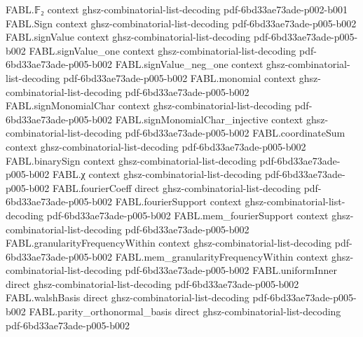\begin{theorem}
\label{FABL.vectorWalshCharacter_apply}
\leanok
{}
\proofstep
  {FABL.𝔽₂}
  {context}
  {ghsz-combinatorial-list-decoding}
  {pdf-6bd33ae73ade-p002-b001}
\proofstep
  {FABL.Sign}
  {context}
  {ghsz-combinatorial-list-decoding}
  {pdf-6bd33ae73ade-p005-b002}
\proofstep
  {FABL.signValue}
  {context}
  {ghsz-combinatorial-list-decoding}
  {pdf-6bd33ae73ade-p005-b002}
\proofstep
  {FABL.signValue_one}
  {context}
  {ghsz-combinatorial-list-decoding}
  {pdf-6bd33ae73ade-p005-b002}
\proofstep
  {FABL.signValue_neg_one}
  {context}
  {ghsz-combinatorial-list-decoding}
  {pdf-6bd33ae73ade-p005-b002}
\proofstep
  {FABL.monomial}
  {context}
  {ghsz-combinatorial-list-decoding}
  {pdf-6bd33ae73ade-p005-b002}
\proofstep
  {FABL.signMonomialChar}
  {context}
  {ghsz-combinatorial-list-decoding}
  {pdf-6bd33ae73ade-p005-b002}
\proofstep
  {FABL.signMonomialChar_injective}
  {context}
  {ghsz-combinatorial-list-decoding}
  {pdf-6bd33ae73ade-p005-b002}
\proofstep
  {FABL.coordinateSum}
  {context}
  {ghsz-combinatorial-list-decoding}
  {pdf-6bd33ae73ade-p005-b002}
\proofstep
  {FABL.binarySign}
  {context}
  {ghsz-combinatorial-list-decoding}
  {pdf-6bd33ae73ade-p005-b002}
\proofstep
  {FABL.χ}
  {context}
  {ghsz-combinatorial-list-decoding}
  {pdf-6bd33ae73ade-p005-b002}
\proofstep
  {FABL.fourierCoeff}
  {direct}
  {ghsz-combinatorial-list-decoding}
  {pdf-6bd33ae73ade-p005-b002}
\proofstep
  {FABL.fourierSupport}
  {context}
  {ghsz-combinatorial-list-decoding}
  {pdf-6bd33ae73ade-p005-b002}
\proofstep
  {FABL.mem_fourierSupport}
  {context}
  {ghsz-combinatorial-list-decoding}
  {pdf-6bd33ae73ade-p005-b002}
\proofstep
  {FABL.granularityFrequencyWithin}
  {context}
  {ghsz-combinatorial-list-decoding}
  {pdf-6bd33ae73ade-p005-b002}
\proofstep
  {FABL.mem_granularityFrequencyWithin}
  {context}
  {ghsz-combinatorial-list-decoding}
  {pdf-6bd33ae73ade-p005-b002}
\proofstep
  {FABL.uniformInner}
  {direct}
  {ghsz-combinatorial-list-decoding}
  {pdf-6bd33ae73ade-p005-b002}
\proofstep
  {FABL.walshBasis}
  {direct}
  {ghsz-combinatorial-list-decoding}
  {pdf-6bd33ae73ade-p005-b002}
\proofstep
  {FABL.parity_orthonormal_basis}
  {direct}
  {ghsz-combinatorial-list-decoding}
  {pdf-6bd33ae73ade-p005-b002}

\end{theorem}
